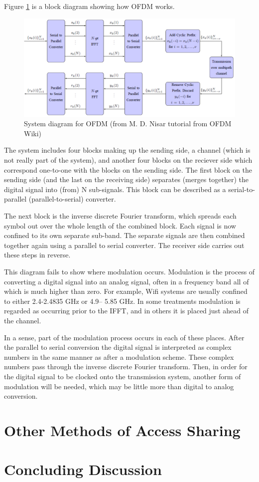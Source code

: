 Figure \ref{ofdmfig} is a block diagram showing how OFDM works.
\begin{figure}
\begin{center}
\includegraphics[width=15 cm]{ofdmfig.png}
\caption{System diagram for OFDM (from M. D. Nisar tutorial from OFDM Wiki)}\label{ofdmfig}
\end{center}
\end{figure}

The system includes four blocks making up the sending side, a channel (which is not really
part of the system), and another four blocks on the reciever side which correspond one-to-one
with the blocks on the sending side. The first block on the sending side (and the last on the
receiving side) separates (merges together) the digital signal into (from) N sub-signals. This
block can be described as a serial-to-parallel (parallel-to-serial) converter.

The next block is the inverse discrete Fourier transform, which spreads each symbol out over
the whole length of the combined block. Each signal is now confined to its own separate
sub-band. The separate signals are then combined together again using a parallel to serial
converter. The receiver side carries out these steps in reverse.

This diagram fails to show where modulation occurs. Modulation is the process of converting
a digital signal into an analog signal, often in a frequency band all of which is much higher
than zero. For example, Wifi systems are usually confined to either 2.4-2.4835 GHz or 4.9–
5.85 GHz. In some treatments modulation is regarded as occurring prior to the IFFT, and in
others it is placed just ahead of the channel.

In a sense, part of the modulation process occurs in each of these places. After the parallel to
serial conversion the digital signal is interpreted as complex numbers in the same manner as
after a modulation scheme. These complex numbers pass through the inverse discrete Fourier
transform. Then, in order for the digital signal to be clocked onto the transmission system,
another form of modulation will be needed, which may be little more than digital to analog
conversion.


\section{Other Methods of Access Sharing}

\section{Concluding Discussion}


